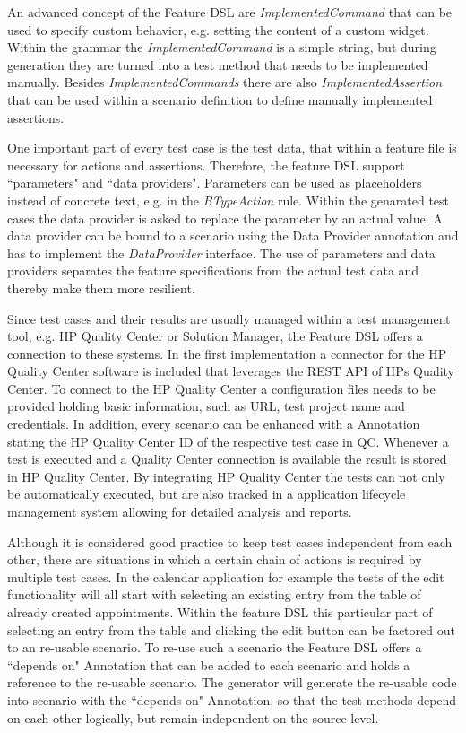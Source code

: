 \documentclass{sig-alternate-05-2015}
\begin{document}
An advanced concept of the Feature DSL are \textit{ImplementedCommand} that can be used to specify custom behavior, e.g. setting the content of a custom widget.
Within the grammar the \textit{ImplementedCommand} is a simple string, but during generation they are turned into a test method that needs to be implemented manually. 
Besides \textit{ImplementedCommands} there are also  \textit{ImplementedAssertion} that can be used within a scenario definition to define manually implemented assertions.

One important part of every test case is the test data, that within a feature file is necessary for actions and assertions.
Therefore, the feature DSL support ``parameters" and ``data providers".
Parameters can be used as placeholders instead of concrete text, e.g. in the \textit{BTypeAction} rule.
Within the genarated test cases the data provider is asked to replace the parameter by an actual value.
A data provider can be bound to a scenario using the Data Provider annotation and has to implement the \textit{DataProvider} interface.
The use of parameters and data providers separates the feature specifications from the actual test data and thereby make them more resilient.

Since test cases and their results are usually managed within a test management tool, e.g. HP Quality Center or Solution Manager, the Feature DSL offers a connection to these systems.
In the first implementation a connector for the HP Quality Center software is included that leverages the REST API of HPs Quality Center.
To connect to the HP Quality Center a configuration files needs to be provided holding basic information, such as URL, test project name and credentials.
In addition, every scenario can be enhanced with a Annotation stating the HP Quality Center ID of the respective test case in QC.
Whenever a test is executed and a Quality Center connection is available the result is stored in HP Quality Center.
By integrating HP Quality Center the tests can not only be automatically executed, but are also tracked in a application lifecycle management system allowing for detailed analysis and reports.

Although it is considered good practice to keep test cases independent from each other, there are situations in which a certain chain of actions is required by multiple test cases.
In the calendar application for example the tests of the edit functionality will all start with selecting an existing entry from the table of already created appointments.
Within the feature DSL this particular part of selecting an entry from the table and clicking the edit button can be factored out to an re-usable scenario.
To re-use such a scenario the Feature DSL offers a ``depends on" Annotation that can be added to each scenario and holds a reference to the re-usable scenario.
The generator will generate the re-usable code into scenario with the ``depends on" Annotation, so that the test methods depend on each other logically, but remain independent on the source level.
\end{document}
